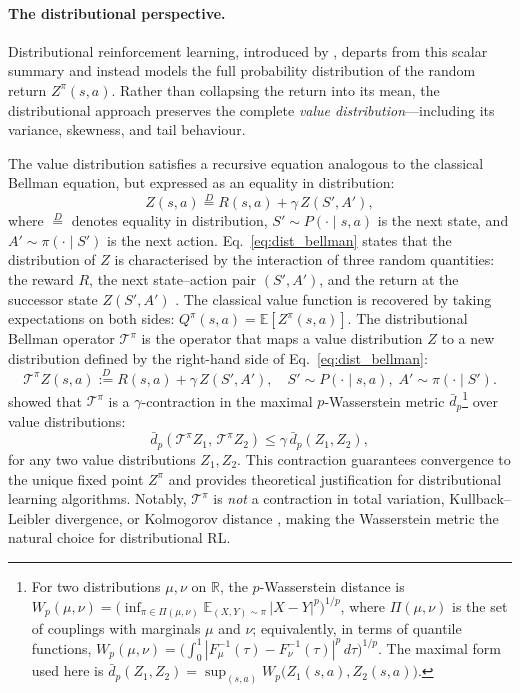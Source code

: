 \documentclass[11pt]{article}
\begin{document}
\paragraph{The distributional perspective.}
Distributional reinforcement learning, introduced by \citet{bellemare2017distributional}, departs from this scalar summary and instead models the full probability distribution of the random return $Z^\pi(s,a)$. Rather than collapsing the return into its mean, the distributional approach preserves the complete \emph{value distribution}---including its variance, skewness, and tail behaviour.

The value distribution satisfies a recursive equation analogous to the classical Bellman equation, but expressed as an equality in distribution:
\begin{equation}\label{eq:dist_bellman}
    Z(s,a) \overset{D}{=} R(s,a) + \gamma\, Z(S', A'),
\end{equation}
where $\overset{D}{=}$ denotes equality in distribution, $S' \sim P(\cdot \mid s, a)$ is the next state, and $A' \sim \pi(\cdot \mid S')$ is the next action. Eq.~\eqref{eq:dist_bellman} states that the distribution of $Z$ is characterised by the interaction of three random quantities: the reward $R$, the next state--action pair $(S', A')$, and the return at the successor state $Z(S', A')$ \citet{bellemare2017distributional}. The classical value function is recovered by taking expectations on both sides: $Q^\pi(s,a) = \mathbb{E}[Z^\pi(s,a)]$. The distributional Bellman operator $\mathcal{T}^\pi$ is the operator that maps a value distribution $Z$ to a new distribution defined by the right-hand side of Eq.~\eqref{eq:dist_bellman}:
\begin{equation}\label{eq:dist_bellman_operator}
    \mathcal{T}^\pi Z(s,a) \overset{D}{:=} R(s,a) + \gamma\, Z(S', A'), \quad S' \sim P(\cdot \mid s, a),\; A' \sim \pi(\cdot \mid S').
\end{equation}
\citet{bellemare2017distributional} showed that $\mathcal{T}^\pi$ is a $\gamma$-contraction in the maximal $p$-Wasserstein metric $\bar{d}_p$\footnote{For two distributions $\mu,\nu$ on $\mathbb{R}$, the $p$-Wasserstein distance is $W_p(\mu,\nu) = \big(\inf_{\pi \in \Pi(\mu,\nu)} \mathbb{E}_{(X,Y)\sim\pi}\,|X-Y|^p\big)^{1/p}$, where $\Pi(\mu,\nu)$ is the set of couplings with marginals $\mu$ and $\nu$; equivalently, in terms of quantile functions, $W_p(\mu,\nu) = \big(\int_0^1 |F_\mu^{-1}(\tau)-F_\nu^{-1}(\tau)|^p\,d\tau\big)^{1/p}$. The maximal form used here is $\bar{d}_p(Z_1,Z_2) = \sup_{(s,a)} W_p\big(Z_1(s,a),Z_2(s,a)\big)$.} over value distributions:
\begin{equation}\label{eq:wasserstein_contraction}
    \bar{d}_p(\mathcal{T}^\pi Z_1,\, \mathcal{T}^\pi Z_2) \leq \gamma\, \bar{d}_p(Z_1, Z_2),
\end{equation}
for any two value distributions $Z_1, Z_2$. This contraction guarantees convergence to the unique fixed point $Z^\pi$ and provides theoretical justification for distributional learning algorithms. Notably, $\mathcal{T}^\pi$ is \emph{not} a contraction in total variation, Kullback--Leibler divergence, or Kolmogorov distance \citet{bellemare2017distributional}, making the Wasserstein metric the natural choice for distributional RL.
\end{document}
